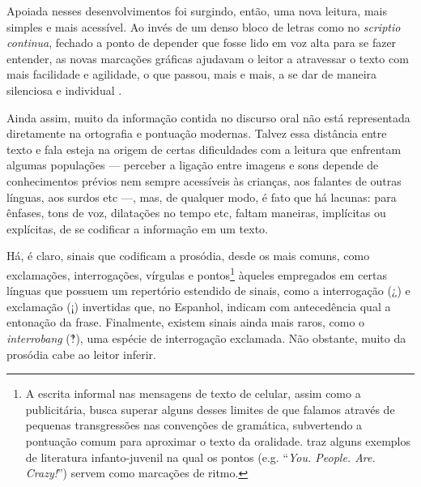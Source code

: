 \documentclass[a4paper,11pt,titlepage,singlespacing]{article}
\begin{document}
   Apoiada nesses desenvolvimentos foi surgindo, então, uma nova leitura, mais simples e mais acessível. Ao invés de um denso bloco de letras como no \textit{scriptio continua}, fechado a ponto de depender que fosse lido em voz alta para se fazer entender, as novas marcações gráficas ajudavam o leitor a atravessar o texto com mais facilidade e agilidade, o que passou, mais e mais, a se dar de maneira silenciosa e individual \cite{kuster2016}.
   
	Ainda assim, muito da informação contida no discurso oral não está representada diretamente na ortografia e pontuação modernas. Talvez essa distância entre texto e fala esteja na origem de certas dificuldades com a leitura que enfrentam algumas populações — perceber a ligação entre imagens e sons depende de conhecimentos prévios nem sempre acessíveis às crianças, aos falantes de outras línguas, aos surdos etc —, mas, de qualquer modo, é fato que há lacunas: para ênfases, tons de voz, dilatações no tempo etc, faltam maneiras, implícitas ou explícitas, de se codificar a informação em um texto. 
    
    Há, é claro, sinais que codificam a prosódia, desde os mais comuns, como exclamações, interrogações, vírgulas e pontos\footnote{A escrita informal nas mensagens de texto de celular, assim como a publicitária, busca superar alguns desses limites de que falamos através de pequenas transgressões nas convenções de gramática, subvertendo a pontuação comum para aproximar o texto da oralidade.  traz alguns exemplos de literatura infanto-juvenil na qual os pontos (e.g. ``\textit{You. People. Are. Crazy!}'') servem como marcações de ritmo.} àqueles empregados em certas línguas que possuem um repertório estendido de sinais, como a interrogação (¿) e exclamação (¡) invertidas que, no Espanhol, indicam com antecedência qual a entonação da frase. Finalmente, existem sinais ainda mais raros, como o \textit{interrobang} (‽), uma espécie de interrogação exclamada. Não obstante, muito da prosódia cabe ao leitor inferir.
    

    
\end{document}
